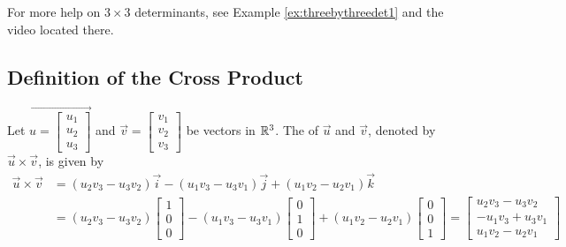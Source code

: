 \documentclass{ximera}
\begin{document}
For more help on $3 \times 3$ determinants, see Example \ref{ex:threebythreedet1} and the video located there.
 
\subsection*{Definition of the Cross Product}
 
\begin{definition}\label{def:crossproduct} Let $\vec{u=\begin{bmatrix}u_1\\u_2\\u_3\end{bmatrix}}$ and $\vec{v}=\begin{bmatrix}v_1\\v_2\\v_3\end{bmatrix}$ be vectors in $\mathbb{R}^3$.  The  of $\vec{u}$ and $\vec{v}$, denoted by $\vec{u}\times\vec{v}$, is given by
\begin{align*}
\vec{u}\times\vec{v}&=(u_2v_3-u_3v_2)\vec{i}-(u_1v_3-u_3v_1)\vec{j}+(u_1v_2-u_2v_1)\vec{k} \\
&=(u_2v_3-u_3v_2)\begin{bmatrix}1\\0\\0\end{bmatrix}-(u_1v_3-u_3v_1)\begin{bmatrix}0\\1\\0\end{bmatrix}+(u_1v_2-u_2v_1)\begin{bmatrix}0\\0\\1\end{bmatrix}=\begin{bmatrix}u_2v_3-u_3v_2\\-u_1v_3+u_3v_1\\u_1v_2-u_2v_1\end{bmatrix}
\end{align*}
\end{definition}
 
\end{document}
